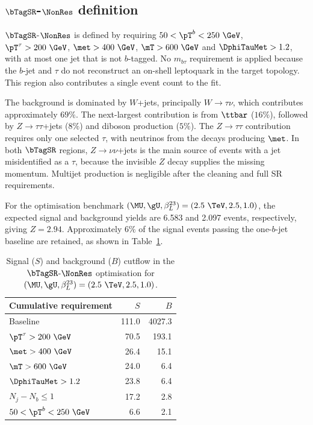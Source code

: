 \clearpage
\subsection[SR1b-NonRes definition]{$\bTagSR$-$\NonRes$ definition}
\label{subsec:ch7_sr1b_nonres}

$\bTagSR$-$\NonRes$ is defined by requiring $50<\pT^b<250~\GeV$, $\pT^\tau>200~\GeV$, $\met>400~\GeV$, $\mT>600~\GeV$ and $\DphiTauMet>1.2$, with at most one jet that is not $b$-tagged.
No $m_{b\tau}$ requirement is applied because the $b$-jet and $\tau$ do not reconstruct an on-shell leptoquark in the target topology.
This region also contributes a single event count to the fit.

The background is dominated by $W$+jets, principally $W\to\tau\nu$, which contributes approximately $69\%$.
The next-largest contribution is from $\ttbar$ ($16\%$), followed by $Z\to\tau\tau$+jets ($8\%$) and diboson production ($5\%$).
The $Z\to\tau\tau$ contribution requires only one selected $\tau$, with neutrinos from the decays producing $\met$.
In both $\bTagSR$ regions, $Z\to\nu\nu$+jets is the main source of events with a jet misidentified as a $\tau$, because the invisible $Z$ decay supplies the missing momentum.
Multijet production is negligible after the cleaning and full SR requirements.

For the optimisation benchmark $(\MU,\gU,\beta_L^{23})=(2.5~\TeV,2.5,1.0)$, the expected signal and background yields are 6.583 and 2.097 events, respectively, giving $Z=2.94$.
Approximately $6\%$ of the signal events passing the one-$b$-jet baseline are retained, as shown in Table~\ref{tab:ch7_cutflow_nonres}.

\begin{table}[htbp]
    \centering
    \small
    \caption{Signal ($S$) and background ($B$) cutflow in the $\bTagSR$-$\NonRes$ optimisation for $(\MU,\gU,\beta_L^{23})=(2.5~\TeV,2.5,1.0)$.}
    \label{tab:ch7_cutflow_nonres}
    \begin{tabular}{lrr}
        \toprule
        Cumulative requirement & $S$ & $B$ \\
        \midrule
        Baseline & 111.0 & 4027.3 \\
        $\pT^\tau>200~\GeV$ & 70.5 & 193.1 \\
        $\met>400~\GeV$ & 26.4 & 15.1 \\
        $\mT>600~\GeV$ & 24.0 & 6.4 \\
        $\DphiTauMet>1.2$ & 23.8 & 6.4 \\
        $N_j-N_b\leq1$ & 17.2 & 2.8 \\
        $50<\pT^b<250~\GeV$ & 6.6 & 2.1 \\
        \bottomrule
    \end{tabular}
\end{table}

